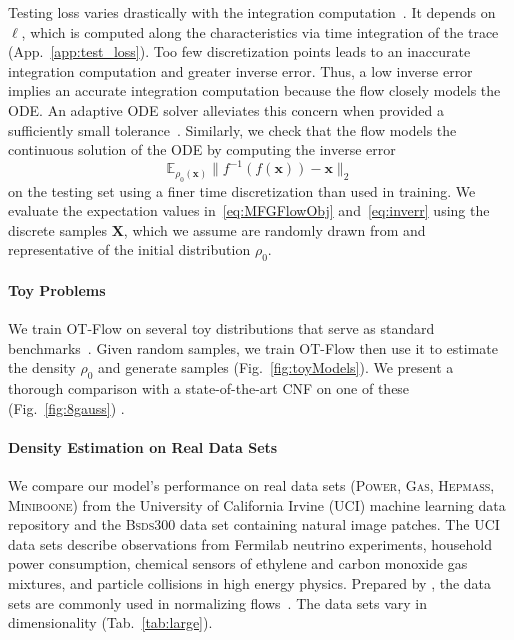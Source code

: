 \documentclass[letterpaper]{article}
\newcommand{\miniboone}{\textsc{Miniboone}}
\newcommand{\power}{\textsc{Power}}
\newcommand{\gas}{\textsc{Gas}}
\newcommand{\hepmass}{\textsc{Hepmass}}
\newcommand{\bsds}{\textsc{Bsds300}}
\newcommand{\bfx}{\boldsymbol{x}}
\newcommand{\bfX}{\boldsymbol{X}}
\newcommand{\model}{OT-Flow} %
\newcommand{\E}{\ensuremath{\mathds{E}}}
\begin{document}
	Testing loss varies drastically with the integration computation~\cite{theis2016mmd,wehenkel2019unconstrained,onken2020do}.
	It depends on $\ell$, which is computed along the characteristics via time integration of the trace (App.~\ref{app:test_loss}).
	Too few discretization points leads to an inaccurate integration computation and greater inverse error. Thus, a low inverse error implies an accurate integration computation because the flow closely models the ODE. An adaptive ODE solver alleviates this concern when provided a sufficiently small tolerance~\cite{grathwohl2019ffjord}. Similarly, we check that the flow models the continuous solution of the ODE by computing the inverse error
	\begin{equation}
		\label{eq:inverr}
	    \E_{\rho_0(\bfx)}\lVert f^{-1} \left( f(\bfx) \right) - \bfx \rVert_{2}	
	\end{equation}	
	on the testing set using a finer time discretization than used in training.
	We evaluate the expectation values in~\eqref{eq:MFGFlowObj} and~\eqref{eq:inverr} using the discrete samples $\bfX$, which we assume are randomly drawn from and representative of the initial distribution $\rho_0$.
	
\paragraph{Toy Problems}

	We train \model{} on several toy distributions that serve as standard benchmarks~\cite{grathwohl2019ffjord,wehenkel2019unconstrained}. Given random samples, we train \model{} then use it to estimate the density $\rho_0$ and generate samples (Fig.~\ref{fig:toyModels}).
	We present a thorough comparison with a state-of-the-art CNF on one of these (Fig.~\ref{fig:8gauss}) .
	




\paragraph{Density Estimation on Real Data Sets}

	We compare our model's performance on real data sets (\power{}, \gas{}, \hepmass{}, \miniboone{}) from the University of California Irvine (UCI) machine learning data repository and the \bsds{} data set containing natural image patches. The UCI data sets describe observations from Fermilab neutrino experiments, household power consumption, chemical sensors of ethylene and carbon monoxide gas mixtures, and particle collisions in high energy physics. Prepared by \citet{papamakarios2017masked}, the data sets 
	are commonly used in normalizing flows~\cite{dinh2016density,grathwohl2019ffjord,huang2018neural,wehenkel2019unconstrained}.
	The data sets vary in dimensionality (Tab.~\ref{tab:large}).
	
\end{document}
